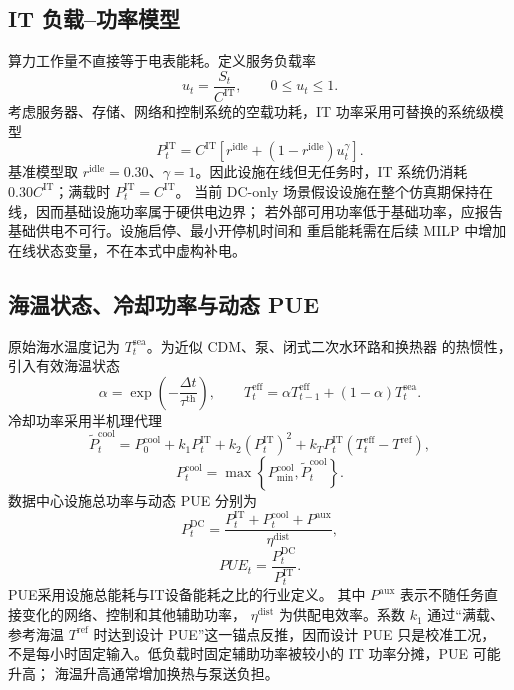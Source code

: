 \subsection{IT 负载--功率模型}

算力工作量不直接等于电表能耗。定义服务负载率
\begin{equation}
u_t=\frac{S_t}{C^{\mathrm{IT}}},
\qquad 0\le u_t\le1.
\end{equation}
考虑服务器、存储、网络和控制系统的空载功耗，IT 功率采用可替换的系统级模型
\begin{equation}
P_t^{\mathrm{IT}}
=C^{\mathrm{IT}}
\left[r^{\mathrm{idle}}+
\left(1-r^{\mathrm{idle}}\right)u_t^{\gamma}\right].
\label{eq:dc-it-power}
\end{equation}
基准模型取 $r^{\mathrm{idle}}=0.30$、$\gamma=1$。因此设施在线但无任务时，IT
系统仍消耗 $0.30C^{\mathrm{IT}}$；满载时 $P_t^{\mathrm{IT}}=C^{\mathrm{IT}}$。
当前 DC-only 场景假设设施在整个仿真期保持在线，因而基础设施功率属于硬供电边界；
若外部可用功率低于基础功率，应报告基础供电不可行。设施启停、最小开停机时间和
重启能耗需在后续 MILP 中增加在线状态变量，不在本式中虚构补电。

\subsection{海温状态、冷却功率与动态 PUE}

原始海水温度记为 $T_t^{\mathrm{sea}}$。为近似 CDM、泵、闭式二次水环路和换热器
的热惯性，引入有效海温状态
\begin{equation}
\alpha=\exp\left(-\frac{\Delta t}{\tau^{\mathrm{th}}}\right),
\qquad
T_t^{\mathrm{eff}}
=\alpha T_{t-1}^{\mathrm{eff}}+
(1-\alpha)T_t^{\mathrm{sea}}.
\label{eq:dc-effective-temp}
\end{equation}
冷却功率采用半机理代理
\begin{equation}
\widetilde P_t^{\mathrm{cool}}
=P_0^{\mathrm{cool}}+k_1P_t^{\mathrm{IT}}
+k_2\left(P_t^{\mathrm{IT}}\right)^2
+k_TP_t^{\mathrm{IT}}
\left(T_t^{\mathrm{eff}}-T^{\mathrm{ref}}\right),
\label{eq:dc-cooling-raw}
\end{equation}
\begin{equation}
P_t^{\mathrm{cool}}
=\max\left\{P_{\min}^{\mathrm{cool}},
\widetilde P_t^{\mathrm{cool}}\right\}.
\label{eq:dc-cooling}
\end{equation}
数据中心设施总功率与动态 PUE 分别为
\begin{equation}
P_t^{\mathrm{DC}}
=\frac{P_t^{\mathrm{IT}}+P_t^{\mathrm{cool}}+P^{\mathrm{aux}}}
{\eta^{\mathrm{dist}}},
\label{eq:dc-total-power}
\end{equation}
\begin{equation}
PUE_t=\frac{P_t^{\mathrm{DC}}}{P_t^{\mathrm{IT}}}.
\label{eq:dc-pue}
\end{equation}
PUE采用设施总能耗与IT设备能耗之比的行业定义\cite{green-grid-pue,doe-pue}。
其中 $P^{\mathrm{aux}}$ 表示不随任务直接变化的网络、控制和其他辅助功率，
$\eta^{\mathrm{dist}}$ 为供配电效率。系数 $k_1$ 通过“满载、参考海温
$T^{\mathrm{ref}}$ 时达到设计 PUE”这一锚点反推，因而设计 PUE 只是校准工况，
不是每小时固定输入。低负载时固定辅助功率被较小的 IT 功率分摊，PUE 可能升高；
海温升高通常增加换热与泵送负担。

